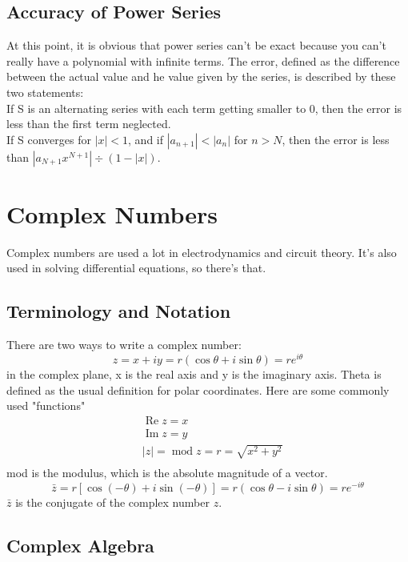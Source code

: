 \documentclass[oneside]{book}
\numberwithin{equation}{chapter} %
\begin{document}
\section{Accuracy of Power Series}
At this point, it is obvious that power series can't be exact because you can't really have a polynomial with infinite terms. The error, defined as the difference between the actual value and he value given by the series, is described by these two statements:\\

If S is an alternating series with each term getting smaller to 0, then the error is less than the first term neglected.\\

If S converges for $|x|<1$, and if $|a_{n+1}|<|a_n|$ for $n>N$, then the error is less than $|a_{N+1}x^{N+1}|\div(1-|x|)$.

\chapter{Complex Numbers}
Complex numbers are used a lot in electrodynamics and circuit theory. It's also used in solving differential equations, so there's that. 
\section{Terminology and Notation}
There are two ways to write a complex number:
\begin{equation}
	z=x+iy=r(\cos\theta+i\sin\theta)=re^{i\theta}
\end{equation}
in the complex plane, x is the real axis and y is the imaginary axis. Theta is defined as the usual definition for polar coordinates. Here are some commonly used "functions"
\begin{align}
	&\operatorname{Re} z=x\\
	&\operatorname{Im} z=y\\
	&|z|=\operatorname{mod} z=r=\sqrt{x^2+y^2}\\
\end{align}
mod is the modulus, which is the absolute magnitude of a vector.
\begin{equation}
	\bar{z}=r[\cos(-\theta)+i\sin(-\theta)]=r(\cos\theta-i\sin\theta)=re^{-i\theta}
\end{equation}
$\bar{z}$ is the conjugate of the complex number $z$. 
\section{Complex Algebra}
\end{document}

